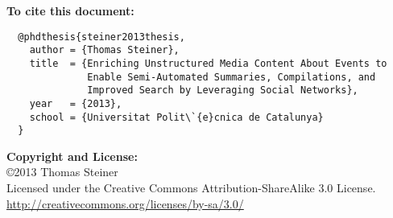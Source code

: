 \begin{acknowledgements}


\vspace{40mm}

\textbf{To cite this document:}

\small
\begin{verbatim}
  @phdthesis{steiner2013thesis,
    author = {Thomas Steiner},
    title  = {Enriching Unstructured Media Content About Events to
              Enable Semi-Automated Summaries, Compilations, and 
              Improved Search by Leveraging Social Networks},
    year   = {2013},
    school = {Universitat Polit\`{e}cnica de Catalunya}
  }
\end{verbatim}

\normalsize

\textbf{Copyright and License:}\\
\copyright 2013 Thomas Steiner\\
Licensed under the Creative Commons Attribution-ShareAlike 3.0 License.\\
\url{http://creativecommons.org/licenses/by-sa/3.0/}

\end{acknowledgements}
